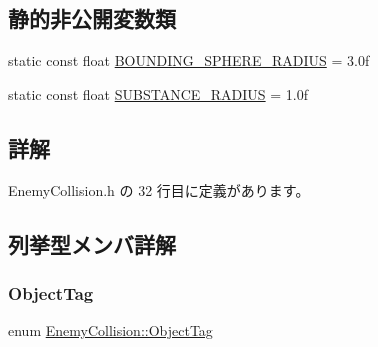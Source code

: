 \subsection*{静的非公開変数類}
\begin{DoxyCompactItemize}
\item 
static const float \mbox{\hyperlink{class_enemy_collision_abb5e13f2f882e313baf784f04f5b465d}{B\+O\+U\+N\+D\+I\+N\+G\+\_\+\+S\+P\+H\+E\+R\+E\+\_\+\+R\+A\+D\+I\+US}} = 3.\+0f
\item 
static const float \mbox{\hyperlink{class_enemy_collision_ab794511516a743fdd9d8f7b00ab6a967}{S\+U\+B\+S\+T\+A\+N\+C\+E\+\_\+\+R\+A\+D\+I\+US}} = 1.\+0f
\end{DoxyCompactItemize}


\subsection{詳解}


 Enemy\+Collision.\+h の 32 行目に定義があります。



\subsection{列挙型メンバ詳解}
\mbox{\label{class_enemy_collision_a8423c2c1dce9ba8ab2ba9bed82ee4843}} 
\subsubsection{\texorpdfstring{Object\+Tag}{ObjectTag}}
{\footnotesize\ttfamily enum \mbox{\hyperlink{class_enemy_collision_a8423c2c1dce9ba8ab2ba9bed82ee4843}{Enemy\+Collision\+::\+Object\+Tag}}}

